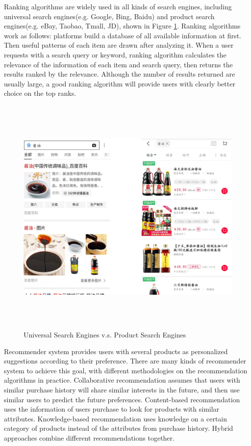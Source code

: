 \documentclass{article}
\begin{document}
Ranking algorithms are widely used in all kinds of search engines, including universal search engines(e.g. Google, Bing, Baidu) and product search engines(e.g. eBay, Taobao, Tmall, JD), shown in Figure \ref{search}. Ranking algorithms work as follows: 
platforms build a database of all available information at first. Then useful patterns of each item are drawn after analyzing it. When a user requests with a search query or keyword, ranking algorithm calculates the relevance of the information of each item and search query, then returns the results ranked by the relevance. Although the number of results returned are usually large, a good ranking algorithm will provide users with clearly better choice on the top ranks. 

\begin{figure}[H]
\centering
\includegraphics[width=16cm, height=12cm]{graphs/rank.jpg}
\caption{\label{search}Universal Search Engines v.s. Product Search Engines}
\end{figure} 

Recommender system provides users with several products as personalized suggestions according to their preference. There are many kinds of recommender system to achieve this goal, with different methodologies on the recommendation algorithms in practice. Collaborative recommendation assumes that users with similar purchase history will share similar interests in the future, and then use similar users to predict the future preferences. Content-based recommendation uses the information of users purchase to look for products with similar attributes. Knowledge-based recommendation uses knowledge on a certain category of products instead of the attributes from purchase history. Hybrid approaches combine different recommendations together.  
\end{document}
